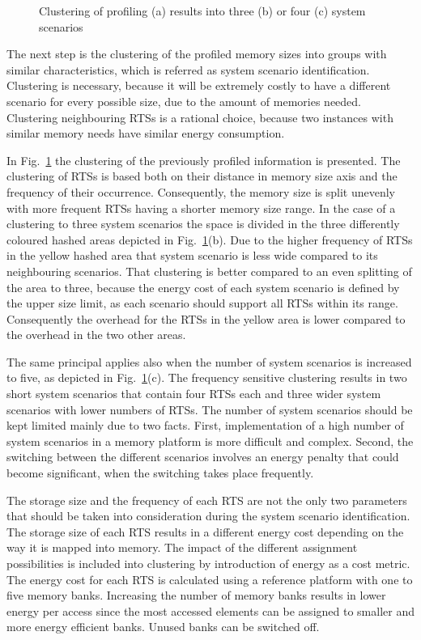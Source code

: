 \documentclass{acm_proc_article-sp}
\begin{document}
\begin{figure}[!t]
\centering
\caption{Clustering of profiling (a) results into three (b) or four (c) system scenarios}
\label{fig:clustering}
\end{figure}

The next step is the clustering of the profiled memory sizes into groups with similar characteristics, which is referred as system scenario identification. Clustering is necessary, because it will be extremely costly to have a different scenario for every possible size, due to the amount of memories needed. Clustering neighbouring RTSs is a rational choice, because two instances with similar memory needs have similar energy consumption. 

In Fig.~\ref{fig:clustering} the clustering of the previously profiled information is presented. The clustering of RTSs is based both on their distance in memory size axis and the frequency of their occurrence. Consequently, the memory size is split unevenly with more frequent RTSs having a shorter memory size range. In the case of a clustering to three system scenarios the space is divided in the three differently coloured hashed areas depicted in Fig.~\ref{fig:clustering}(b). Due to the higher frequency of RTSs in the yellow hashed area that system scenario is less wide compared to its neighbouring scenarios. That clustering is better compared to an even splitting of the area to three, because the energy cost of each system scenario is defined by the upper size limit, as each scenario should support all RTSs within its range. Consequently the overhead for the RTSs in the yellow area is lower compared to the overhead in the two other areas.

The same principal applies also when the number of system scenarios is increased to five, as depicted in Fig.~\ref{fig:clustering}(c). The frequency sensitive clustering results in two short system scenarios that contain four RTSs each and three wider system scenarios with lower numbers of RTSs. The number of system scenarios should be kept limited mainly due to two facts. First, implementation of a high number of system scenarios in a memory platform is more difficult and complex. Second, the switching between the different scenarios involves an energy penalty that could become significant, when the switching takes place frequently.

The storage size and the frequency of each RTS are not the only two parameters that should be taken into consideration during the system scenario identification. The storage size of each RTS results in a different energy cost depending on the way it is mapped into memory. The impact of the different assignment possibilities is included into clustering by introduction of energy as a cost metric. The energy cost for each RTS is calculated using a reference platform with one to five memory banks. Increasing the number of memory banks results in lower energy per access since the most accessed elements can be assigned to smaller and more energy efficient banks. Unused banks can be switched off.
\end{document}
